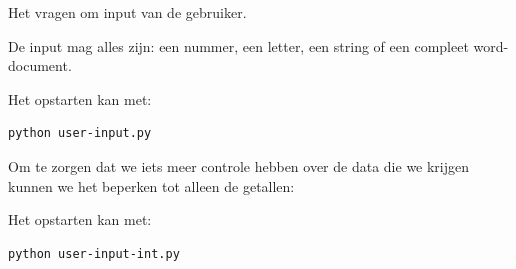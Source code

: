 
Het vragen om input van de gebruiker.

De input mag alles zijn: een nummer, een letter, een string of een compleet word-document.

Het opstarten kan met:
\begin{lstlisting}[language=bash]
python user-input.py
\end{lstlisting}


Om te zorgen dat we iets meer controle hebben over de data die we krijgen kunnen we het beperken tot alleen de getallen:


Het opstarten kan met:
\begin{lstlisting}[language=bash]
python user-input-int.py
\end{lstlisting}

